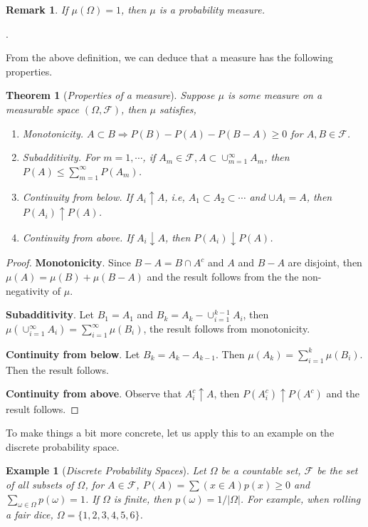 \documentclass[10pt,a4paper]{article}
\newtheorem{theorem}{Theorem}[section]
\newtheorem{example}{Example}[section]
\numberwithin{equation}{subsection}
\newtheorem{remark}{Remark}
\begin{document}
\begin{remark}
If $\mu(\Omega) = 1$, then $\mu$ is a probability measure. 
\end{remark}.

From the above definition, we can deduce that a measure
has the following properties. 

\begin{theorem}[\emph{Properties of a measure}]
Suppose $\mu$ is some measure on a measurable space 
$(\Omega, \mathcal{F})$, then $\mu$ satisfies,
\begin{enumerate}
	\item Monotonicity. $A\subset B \Rightarrow P(B) - P(A) - P(B-A) \geq 0$ for $A, B \in \mathcal{F}$.
	\item Subadditivity. For $m = 1, \cdots$, if $A_m \in \mathcal{F}, A \subset \cup_{m=1}^\infty A_m$, then $P(A) \leq \sum_{m=1}^\infty P(A_m)$.
	\item Continuity from below. If $A_i \uparrow A$, i.e,
	$A_1\subset A_2 \subset \cdots$ and $\cup A_i = A$, 
	then $P(A_i) \uparrow P(A)$.
	\item Continuity from above. If $A_i \downarrow A$, 
	then $P(A_i) \downarrow P(A)$. 
\end{enumerate}
\end{theorem}

\begin{proof}
	\textbf{Monotonicity}. Since $B-A = B \cap A^c$ and
	$A$ and $B-A$ are disjoint, then $\mu(A) = \mu(B) + \mu(B-A)$
	and the result follows from the the non-negativity of 
	$\mu$. 
	
	\textbf{Subadditivity}. Let $B_1 = A_1$ and $B_k =
	A_k - \cup_{i=1}^{k-1} A_i$, then $\mu(\cup_{i=1}^\infty A_i) = \sum_{i=1}^\infty \mu(B_i)$,
	 the result follows
	from monotonicity.
	
	\textbf{Continuity from below}. Let $B_k = A_k - A_{k-1}$. Then $\mu(A_k) = \sum_{i=1}^k \mu(B_i)$. Then the 
	result follows. 
	
	\textbf{Continuity from above}. Observe that 
	$A_i^c \uparrow A$, then $P(A_i^c) \uparrow P(A^c)$
	and the result follows.
\end{proof}

To make things a bit more concrete, let us apply this
to an example on the discrete probability space. 

\begin{example}[\emph{Discrete Probability Spaces}]
Let $\Omega$ be a countable set, $\mathcal{F}$ be
the set of all subsets of $\Omega$, for $A \in \mathcal{F}$,
$P(A) = \sum(x \in A) p(x) \geq 0$ and $\sum_{\omega \in \Omega} p(\omega) = 1$. If $\Omega$ is finite, then 
$p(\omega) = 1/|\Omega|$. For example, when
rolling a fair dice, $\Omega = \{1,2,3,4,5,6\}$. 
\end{example}
\end{document}
